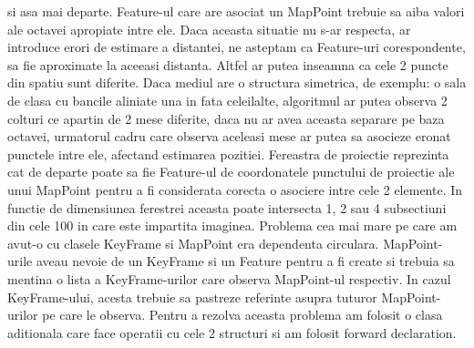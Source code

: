 \documentclass[12pt,a4paper]{report}
\begin{document}
si asa mai departe. Feature-ul care are asociat un MapPoint trebuie sa aiba valori ale octavei
apropiate intre ele. Daca aceasta situatie nu s-ar respecta, ar introduce erori de estimare 
a distantei, ne asteptam ca Feature-uri corespondente, sa fie aproximate la aceeasi distanta.
Altfel ar putea inseamna ca cele 2 puncte din spatiu sunt diferite. Daca mediul are o structura 
simetrica, de exemplu: o sala de clasa cu bancile aliniate una in fata celeilalte, algoritmul 
ar putea observa 2 colturi ce apartin de 2 mese diferite, daca nu ar avea aceasta separare 
pe baza octavei, urmatorul cadru care observa aceleasi mese ar putea sa asocieze eronat punctele 
intre ele, afectand estimarea pozitiei. Fereastra de proiectie reprezinta cat de departe poate 
sa fie Feature-ul de coordonatele punctului de proiectie ale unui MapPoint pentru a fi considerata
corecta o asociere intre cele 2 elemente. In functie de dimensiunea ferestrei aceasta poate intersecta 1, 2 sau 4 subsectiuni din cele 100 in care 
este impartita imaginea. Problema cea mai mare pe care am avut-o cu clasele KeyFrame si MapPoint
era dependenta circulara. MapPoint-urile aveau nevoie de un KeyFrame si un Feature pentru a fi 
create si trebuia sa mentina o lista a KeyFrame-urilor care observa MapPoint-ul respectiv.
In cazul KeyFrame-ului, acesta trebuie sa pastreze referinte asupra tuturor MapPoint-urilor pe 
care le observa. Pentru a rezolva aceasta problema am folosit o clasa aditionala care face 
operatii cu cele 2 structuri si am folosit forward declaration.  \\  
\end{document}

